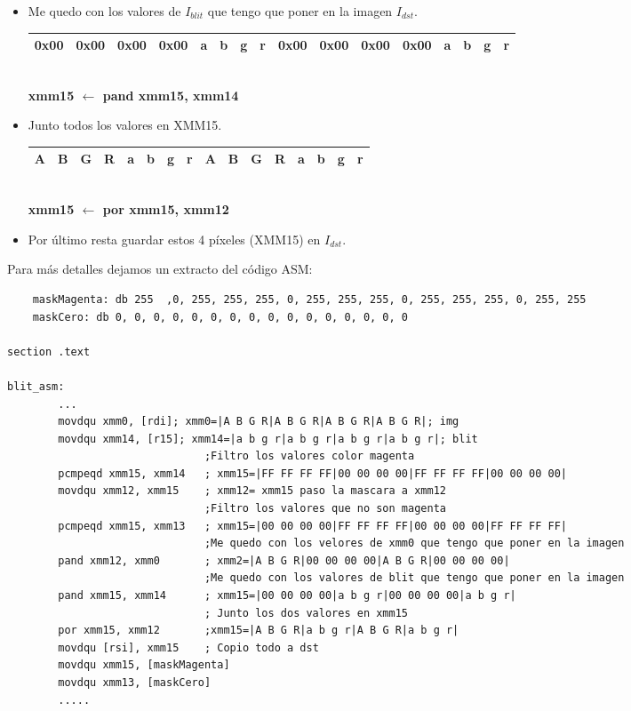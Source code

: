 \begin{itemize}
	\item Me quedo con los valores de $I_{blit}$ que tengo que poner en la imagen $I_{dst}$.
		\begin{center}
		   \begin{tabular}{| c | c | c | c || c | c | c | c || c | c | c | c || c | c | c | c |}
			 \hline
			 0x00 & 0x00 & 0x00 & 0x00 & a & b & g & r & 0x00 & 0x00 & 0x00 & 0x00 & a & b & g & r \\ \hline
		   \end{tabular}
		   \\ \textbf{xmm15 $\gets$ pand xmm15, xmm14}
		\end{center}		
	
	\item Junto todos los valores en XMM15.
		\begin{center}
		   \begin{tabular}{| c | c | c | c || c | c | c | c || c | c | c | c || c | c | c | c |}
			 \hline
			 A & B & G & R & a & b & g & r & A & B & G & R & a & b & g & r \\ \hline
		   \end{tabular}
		   \\ \textbf{xmm15 $\gets$ por xmm15, xmm12}
		\end{center}		
	\item Por último resta guardar estos 4 píxeles (XMM15) en $I_{dst}$.

\end{itemize}

Para más detalles dejamos un extracto del código ASM:

\begin{codesnippet}
\begin{verbatim}
	maskMagenta: db 255	 ,0, 255, 255, 255, 0, 255, 255, 255, 0, 255, 255, 255, 0, 255, 255
	maskCero: db 0, 0, 0, 0, 0, 0, 0, 0, 0, 0, 0, 0, 0, 0, 0, 0 

section .text

blit_asm:
		...
		movdqu xmm0, [rdi]; xmm0=|A B G R|A B G R|A B G R|A B G R|; img	
		movdqu xmm14, [r15]; xmm14=|a b g r|a b g r|a b g r|a b g r|; blit
							   ;Filtro los valores color magenta
		pcmpeqd xmm15, xmm14   ; xmm15=|FF FF FF FF|00 00 00 00|FF FF FF FF|00 00 00 00| 
		movdqu xmm12, xmm15	   ; xmm12= xmm15 paso la mascara a xmm12 
							   ;Filtro los valores que no son magenta
		pcmpeqd xmm15, xmm13   ; xmm15=|00 00 00 00|FF FF FF FF|00 00 00 00|FF FF FF FF|
							   ;Me quedo con los velores de xmm0 que tengo que poner en la imagen
		pand xmm12, xmm0       ; xmm2=|A B G R|00 00 00 00|A B G R|00 00 00 00|
							   ;Me quedo con los valores de blit que tengo que poner en la imagen
		pand xmm15, xmm14      ; xmm15=|00 00 00 00|a b g r|00 00 00 00|a b g r|
							   ; Junto los dos valores en xmm15
		por xmm15, xmm12 	   ;xmm15=|A B G R|a b g r|A B G R|a b g r|
		movdqu [rsi], xmm15	   ; Copio todo a dst
		movdqu xmm15, [maskMagenta]
		movdqu xmm13, [maskCero]
		.....
\end{verbatim}
\end{codesnippet}
